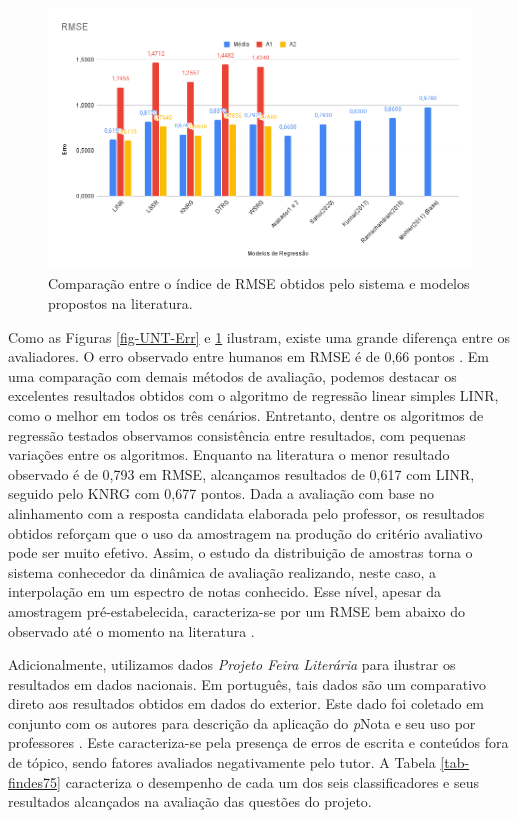 \begin{figure}[!h]
\centering
\includegraphics[width=\textwidth]{figuras/UNT-RMSE}
\caption{Comparação entre o índice de RMSE obtidos pelo sistema e modelos propostos na literatura.}
\label{fig-UNT-RMSE}
\end{figure}

Como as Figuras \ref{fig-UNT-Err} e \ref{fig-UNT-RMSE} ilustram, existe uma grande diferença entre os avaliadores. O erro observado entre humanos em RMSE é de 0,66 pontos \cite{mohler2011}. Em uma comparação com demais métodos de avaliação, podemos destacar os excelentes resultados obtidos com o algoritmo de regressão linear simples LINR, como o melhor em todos os três cenários. Entretanto, dentre os algoritmos de regressão testados observamos consistência entre resultados, com pequenas variações entre os algoritmos. Enquanto na literatura o menor resultado observado é de 0,793 em RMSE, alcançamos resultados de 0,617 com LINR, seguido pelo KNRG com 0,677 pontos. Dada a avaliação com base no alinhamento com a resposta candidata elaborada pelo professor, os resultados obtidos reforçam que o uso da amostragem na produção do critério avaliativo pode ser muito efetivo. Assim, o estudo da distribuição de amostras torna o sistema conhecedor da dinâmica de avaliação realizando, neste caso, a interpolação em um espectro de notas conhecido. Esse nível, apesar da amostragem pré-estabelecida, caracteriza-se por um RMSE bem abaixo do observado até o momento na literatura \cite{ramachandran2015b, kumar2017, sahu2020}.





Adicionalmente, utilizamos dados \textit{Projeto Feira Literária} para ilustrar os resultados em dados nacionais. Em português, tais dados são um comparativo direto aos resultados obtidos em dados do exterior. Este dado foi coletado em conjunto com os autores para descrição da aplicação do \textit{p}Nota e seu uso por professores \cite{nascimento2020}. Este caracteriza-se pela presença de erros de escrita e conteúdos fora de tópico, sendo fatores avaliados negativamente pelo tutor. A Tabela \ref{tab-findes75} caracteriza o desempenho de cada um dos seis classificadores e seus resultados alcançados na avaliação das questões do projeto.

